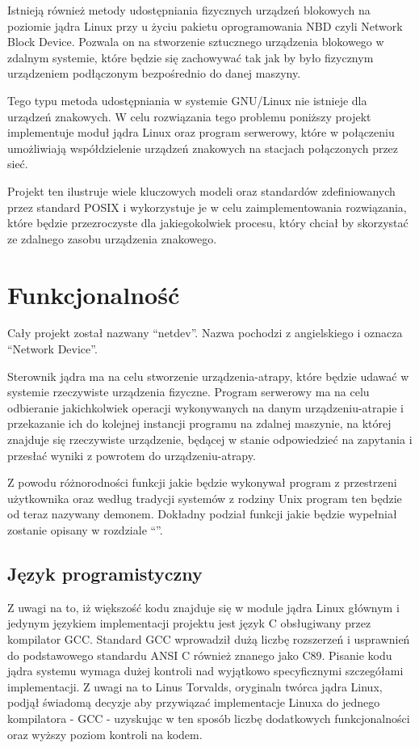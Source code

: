 \documentclass[11pt]{scrartcl}
\let\stdsection\section
\renewcommand\section{\newpage\stdsection}
\begin{document}
Istnieją również metody udostępniania fizycznych urządzeń blokowych na poziomie jądra Linux przy u życiu pakietu oprogramowania NBD czyli Network Block Device. Pozwala on na stworzenie sztucznego urządzenia blokowego w zdalnym systemie, które będzie się zachowywać tak jak by było fizycznym urządzeniem podłączonym bezpośrednio do danej maszyny.

Tego typu metoda udostępniania w systemie GNU/Linux nie istnieje dla urządzeń znakowych. W celu rozwiązania tego problemu poniższy projekt implementuje moduł jądra Linux oraz program serwerowy, które w połączeniu umożliwiają współdzielenie urządzeń znakowych na stacjach połączonych przez sieć.

Projekt ten ilustruje wiele kluczowych modeli oraz standardów zdefiniowanych przez standard POSIX i wykorzystuje je w celu zaimplementowania rozwiązania, które będzie przezroczyste dla jakiegokolwiek procesu, który chciał by skorzystać ze zdalnego zasobu urządzenia znakowego.

\section{Funkcjonalność}
\label{functionality}

Cały projekt został nazwany ``netdev''. Nazwa pochodzi z angielskiego i oznacza ``Network Device''.

Sterownik jądra ma na celu stworzenie urządzenia-atrapy, które będzie udawać w systemie rzeczywiste urządzenia fizyczne. Program serwerowy ma na celu odbieranie jakichkolwiek operacji wykonywanych na danym urządzeniu-atrapie i przekazanie ich do kolejnej instancji programu na zdalnej maszynie, na której znajduje się rzeczywiste urządzenie, będącej w stanie odpowiedzieć na zapytania i przesłać wyniki z powrotem do urządzeniu-atrapy.

Z powodu różnorodności funkcji jakie będzie wykonywał program z przestrzeni użytkownika oraz według tradycji systemów z rodziny Unix program ten będzie od teraz nazywany demonem. Dokładny podział funkcji jakie będzie wypełniał zostanie opisany w rozdziale ``''.

\subsection{Język programistyczny}
\label{language}

Z uwagi na to, iż większość kodu znajduje się w module jądra Linux głównym i jedynym językiem implementacji projektu jest język C obsługiwany przez kompilator GCC\@. Standard GCC wprowadził dużą liczbę rozszerzeń i usprawnień do podstawowego standardu ANSI C również znanego jako C89. Pisanie kodu jądra systemu wymaga dużej kontroli nad wyjątkowo specyficznymi szczegółami implementacji. Z uwagi na to Linus Torvalds, oryginaln twórca jądra Linux, podjął świadomą decyzje aby przywiązać implementacje Linuxa do jednego kompilatora - GCC - uzyskując w ten sposób liczbę dodatkowych funkcjonalności\cite{gccextensions} oraz wyższy poziom kontroli na kodem.
\end{document}
